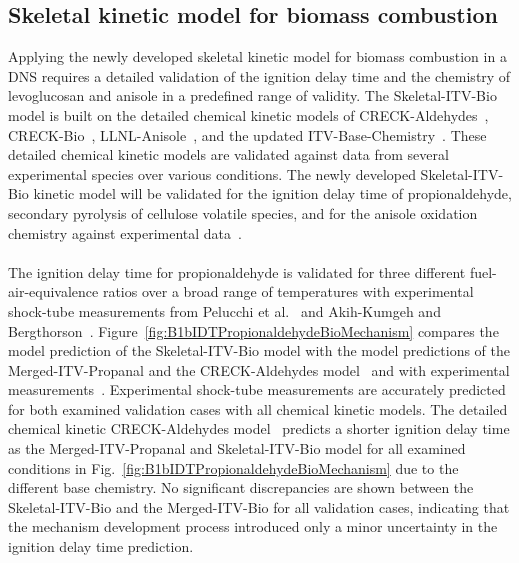 \begin{refsection}
\subsection{Skeletal kinetic model for biomass combustion}
 Applying the newly developed skeletal kinetic model for biomass combustion in a DNS requires a detailed validation of the ignition delay time and the chemistry of levoglucosan and anisole in a predefined range of validity. The Skeletal-ITV-Bio model is built on the detailed chemical kinetic models of CRECK-Aldehydes~\cite{Pelucchi2015}, CRECK-Bio~\cite{Debiagi2016}, LLNL-Anisole~\cite{Wagnon2018}, and the updated ITV-Base-Chemistry~\cite{Langer2023}. These detailed chemical kinetic models are validated against data from several experimental species over various conditions. The newly developed Skeletal-ITV-Bio kinetic model will be validated for the ignition delay time of propionaldehyde, secondary pyrolysis of cellulose volatile species, and for the anisole oxidation chemistry against experimental data~\cite{Pelucchi2015, AkihKumgeh2011, Norinaga2013, Chen2022}.
\\\\
The ignition delay time for propionaldehyde is validated for three different fuel-air-equivalence ratios over a broad range of temperatures with experimental shock-tube measurements from Pelucchi et al.~\cite{Pelucchi2015} and Akih-Kumgeh and Bergthorson~\cite{AkihKumgeh2011}. Figure~\ref{fig:B1bIDTPropionaldehydeBioMechanism} compares the model prediction of the Skeletal-ITV-Bio model with the model predictions of the Merged-ITV-Propanal and the CRECK-Aldehydes model~\cite{Pelucchi2015} and with experimental measurements~\cite{Pelucchi2015, AkihKumgeh2011}. Experimental shock-tube measurements are accurately predicted for both examined validation cases with all chemical kinetic models. The detailed chemical kinetic CRECK-Aldehydes model~\cite{Pelucchi2015} predicts a shorter ignition delay time as the Merged-ITV-Propanal and Skeletal-ITV-Bio model for all examined conditions in Fig.~\ref{fig:B1bIDTPropionaldehydeBioMechanism} due to the different base chemistry. No significant discrepancies are shown between the Skeletal-ITV-Bio and the Merged-ITV-Bio for all validation cases, indicating that the mechanism development process introduced only a minor uncertainty in the ignition delay time prediction.
\begin{figure}[h]
  \centering

\end{figure}
\end{refsection}
